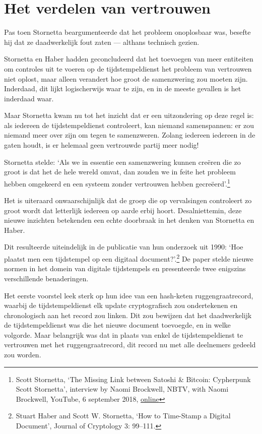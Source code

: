 \documentclass[smalldemyvopaper,11pt,twoside,onecolumn,openright,extrafontsizes,hidelinks]{memoir}
\begin{document}
\section{Het verdelen van vertrouwen}\label{het-verdelen-van-vertrouwen}

Pas toen Stornetta beargumenteerde dat het probleem onoplosbaar was,
besefte hij dat ze daadwerkelijk fout zaten --- althans technisch
gezien.

Stornetta en Haber hadden geconcludeerd dat het toevoegen van meer
entiteiten om controles uit te voeren op de tijdstempeldienst het
probleem van vertrouwen niet oplost, maar alleen verandert hoe groot de
samenzwering zou moeten zijn. Inderdaad, dit lijkt logischerwijs waar te
zijn, en in de meeste gevallen is het inderdaad waar.

Maar Stornetta kwam nu tot het inzicht dat er een uitzondering op deze
regel is: als iedereen de tijdstempeldienst controleert, kan niemand
samenspannen: er zou niemand meer over zijn om tegen te samenzweren.
Zolang iedereen iedereen in de gaten houdt, is er helemaal geen
vertrouwde partij meer nodig!

Stornetta stelde: `Als we in essentie een samenzwering kunnen creëren
die zo groot is dat het de hele wereld omvat, dan zouden we in feite het
probleem hebben omgekeerd en een systeem zonder vertrouwen hebben
gecreëerd'.\footnote{Scott Stornetta, `The Missing Link between Satoshi
  \& Bitcoin: Cypherpunk Scott Stornetta', interview by Naomi Brockwell,
  NBTV, with Naomi Brockwell, YouTube, 6 september 2018,
  \href{https://www.youtube.com/watch?v=fYr-keVOQ18}{online}}

Het is uiteraard onwaarschijnlijk dat de groep die op vervalsingen
controleert zo groot wordt dat letterlijk iedereen op aarde erbij hoort.
Desalniettemin, deze nieuwe inzichten betekenden een echte doorbraak in
het denken van Stornetta en Haber.

Dit resulteerde uiteindelijk in de publicatie van hun onderzoek uit
1990: `Hoe plaatst men een tijdstempel op een digitaal
document?'.\footnote{Stuart Haber and Scott W. Stornetta, `How to
  Time-Stamp a Digital Document', Journal of Cryptology 3: 99--111.} De
paper stelde nieuwe normen in het domein van digitale tijdstempels en
presenteerde twee enigszins verschillende benaderingen.

Het eerste voorstel leek sterk op hun idee van een hash-keten
ruggengraatrecord, waarbij de tijdstempeldienst elk update
cryptografisch zou ondertekenen en chronologisch aan het record zou
linken. Dit zou bewijzen dat het daadwerkelijk de tijdstempeldienst was
die het nieuwe document toevoegde, en in welke volgorde. Maar belangrijk
was dat in plaats van enkel de tijdstempeldienst te vertrouwen met het
ruggengraatrecord, dit record nu met alle deelnemers gedeeld zou worden.
\end{document}
